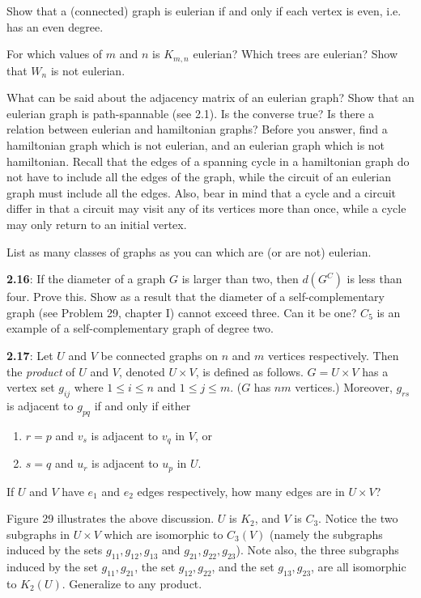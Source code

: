 \documentclass{article}
\begin{document}
Show that a (connected) graph is eulerian if and only if each vertex is even, i.e. has an even degree.

For which values of $m$ and $n$ is $K_{m,n}$ eulerian? Which trees are eulerian? Show that $W_n$ is not eulerian.

What can be said about the adjacency matrix of an eulerian graph? Show that an eulerian graph is path-spannable (see 2.1). Is the converse true? Is there a relation between eulerian and hamiltonian graphs? Before you answer, find a hamiltonian graph which is not eulerian, and an eulerian graph which is not hamiltonian. Recall that the edges of a spanning cycle in a hamiltonian graph do not have to include all the edges of the graph, while the circuit of an eulerian graph must include all the edges. Also, bear in mind that a cycle and a circuit differ in that a circuit may visit any of its vertices more than once, while a cycle may only return to an initial vertex.

List as many classes of graphs as you can which are (or are not) eulerian.

\vspace{0.5cm}

\textbf{2.16}: If the diameter of a graph $G$ is larger than two, then $d(G^C)$ is less than four. Prove this. Show as a result that the diameter of a self-complementary graph (see Problem 29, chapter I) cannot exceed three. Can it be one? $C_5$ is an example of a self-complementary graph of degree two.

\vspace{0.5cm}

\textbf{2.17}: Let $U$ and $V$ be connected graphs on $n$ and $m$ vertices respectively. Then the \emph{product} of $U$ and $V$, denoted $U \times V$, is defined as follows. $G = U \times V$ has a vertex set $g_{ij}$ where $1 \leq i \leq n$ and $1 \leq j \leq m$. ($G$ has $nm$ vertices.) Moreover, $g_{rs}$ is adjacent to $g_{pq}$ if and only if either
\begin{enumerate}[\hspace{1cm}(1)]
  \item $r=p$ and $v_s$ is adjacent to $v_q$ in $V$, or
  \item $s=q$ and $u_r$ is adjacent to $u_p$ in $U$.
\end{enumerate}

If $U$ and $V$ have $e_1$ and $e_2$ edges respectively, how many edges are in $U \times V$?

Figure 29 illustrates the above discussion. $U$ is $K_2$, and $V$ is $C_3$. Notice the two subgraphs in $U \times V$ which are isomorphic to $C_3(V)$ (namely the subgraphs induced by the sets $g_{11}, g_{12}, g_{13}$ and $g_{21}, g_{22}, g_{23}$). Note also, the three subgraphs induced by the set $g_{11}, g_{21}$, the set $g_{12}, g_{22}$, and the set $g_{13}, g_{23}$, are all isomorphic to $K_2(U)$. Generalize to any product.
\end{document}
